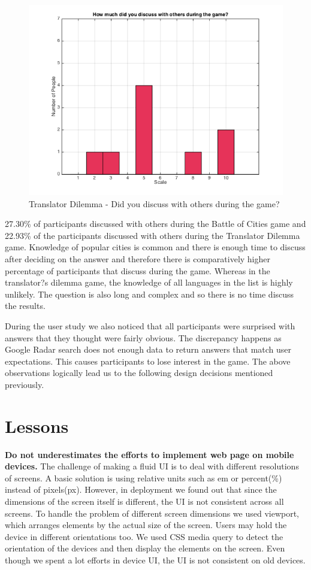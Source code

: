 \documentclass{sig-alternate}
\begin{document}
{\begin{figure}
	\includegraphics[width=\linewidth]{t_discuss.png}
	\caption{Translator Dilemma - Did you discuss with others during the game?}
	\label{fig:t_discuss}
\end{figure}

27.30\% of participants discussed with others during the Battle of Cities game and 22.93\% of the participants discussed with others during the Translator Dilemma game. Knowledge of popular cities is common and there is enough time to discuss after deciding on the answer and therefore there is comparatively higher percentage of participants that discuss during the game. Whereas in the translator?s dilemma game, the knowledge of all languages in the list is highly unlikely. The question is also long and complex and so there is no time discuss the results. 

During the user study we also noticed that all participants were surprised with answers that they thought were fairly obvious. The discrepancy happens as Google Radar search does not enough data to return answers that match user expectations. This causes participants to lose interest in the game. The above observations logically lead us to the following design decisions mentioned previously.


\section{Lessons}
\textbf{Do not underestimates the efforts to implement web page on mobile devices. }
The challenge of making a fluid UI is to deal with different resolutions of 
screens. A basic solution is using relative units such as em or percent(\%) 
instead of pixels(px). However, in deployment we found out that since the 
dimensions of the screen itself is different, the UI is not consistent across 
all screens. To handle the problem of different screen dimensions we used 
viewport, which arranges elements by the actual size of the screen. Users 
may hold the device in different orientations too. We used CSS media query 
to detect the orientation of the devices and then display the elements on
 the screen. Even though we spent a lot efforts in device UI, the UI is not 
 consistent on old devices.
 
}
\end{document}
